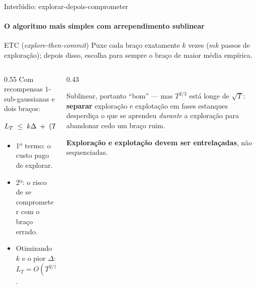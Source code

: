 \documentclass[aspectratio=169, 10pt]{beamer}
\newcommand{\gap}{\Delta}
\newcommand{\Reg}{L}
\begin{document}
\begin{frame}{Interlúdio: explorar-depois-comprometer}
  \framesubtitle{O algoritmo mais simples com arrependimento sublinear}

  \begin{algbox}{ETC (\emph{explore-then-commit})}
    Puxe cada braço exatamente $k$ vezes ($mk$ passos de exploração);
    depois disso, escolha para sempre o braço de maior média empírica.
  \end{algbox}

  \begin{columns}[T]
    \begin{column}{0.55\textwidth}
      Com recompensas $1$-sub-gaussianas e dois braços:
      \[
        \Reg_T \;\le\; k\gap
          \;+\; (T - 2k)\,\gap \exp\Bigl(-\frac{k\gap^2}{4}\Bigr).
      \]
      \begin{itemize}\small
        \item 1º termo: o custo pago de explorar.
        \item 2º: o risco de se comprometer com o braço errado.
        \item Otimizando $k$ e o pior $\gap$: $\Reg_T = O(T^{2/3})$.
      \end{itemize}
    \end{column}
    \begin{column}{0.43\textwidth}
      \begin{ideiabox}[fontupper=\footnotesize]
        Sublinear, portanto ``bom'' --- mas $T^{2/3}$ está longe de
        $\sqrt{T}$: \textbf{separar} exploração e explotação em fases
        estanques desperdiça o que se aprendeu \emph{durante} a exploração
        para abandonar cedo um braço ruim.
      \end{ideiabox}
      \begin{alertabox}[fontupper=\footnotesize]
        \textbf{Exploração e explotação devem ser entrelaçadas}, não
        sequenciadas.
      \end{alertabox}
    \end{column}
  \end{columns}
\end{frame}
\end{document}

